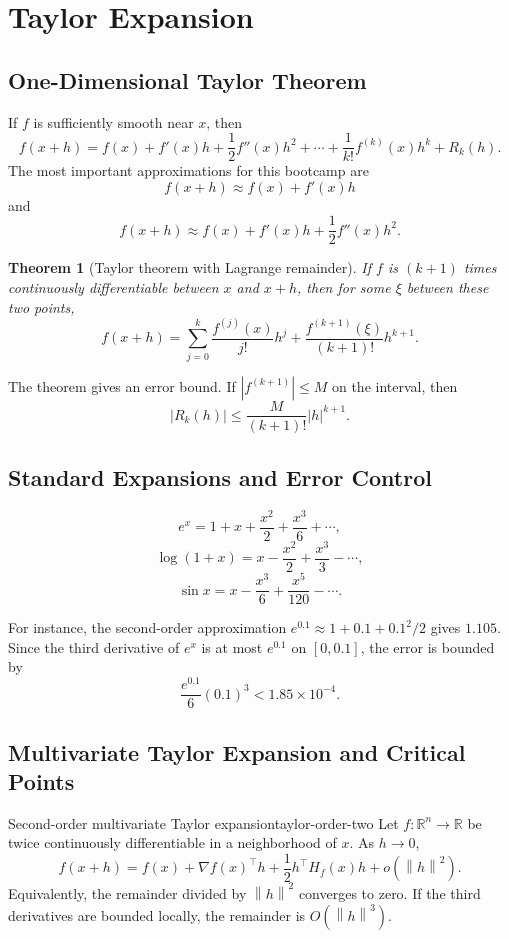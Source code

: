 \documentclass[11pt]{article}
\newcommand{\R}{\mathbb{R}}
\newcommand{\norm}[1]{\left\lVert #1\right\rVert}
\theoremstyle{definition}
\theoremstyle{plain}
\newtheorem{theorem}[definition]{Theorem}
\theoremstyle{remark}
\begin{document}
\section{Taylor Expansion}

\subsection{One-Dimensional Taylor Theorem}

If $f$ is sufficiently smooth near $x$, then
\[
f(x+h)=f(x)+f'(x)h+\frac{1}{2}f''(x)h^2+\cdots+
\frac{1}{k!}f^{(k)}(x)h^k+R_k(h).
\]
The most important approximations for this bootcamp are
\[
f(x+h)\approx f(x)+f'(x)h
\]
and
\[
f(x+h)\approx f(x)+f'(x)h+\frac{1}{2}f''(x)h^2.
\]

\begin{theorem}[Taylor theorem with Lagrange remainder]
If $f$ is $(k+1)$ times continuously differentiable between $x$ and $x+h$,
then for some $\xi$ between these two points,
\[
f(x+h)=\sum_{j=0}^k\frac{f^{(j)}(x)}{j!}h^j
+\frac{f^{(k+1)}(\xi)}{(k+1)!}h^{k+1}.
\]
\end{theorem}

The theorem gives an error bound. If $|f^{(k+1)}|\leq M$ on the interval, then
\[
|R_k(h)|\leq\frac{M}{(k+1)!}|h|^{k+1}.
\]

\subsection{Standard Expansions and Error Control}

\[
e^x=1+x+\frac{x^2}{2}+\frac{x^3}{6}+\cdots,
\]
\[
\log(1+x)=x-\frac{x^2}{2}+\frac{x^3}{3}-\cdots,
\]
\[
\sin x=x-\frac{x^3}{6}+\frac{x^5}{120}-\cdots.
\]

For instance, the second-order approximation $e^{0.1}\approx1+0.1+0.1^2/2$
gives $1.105$. Since the third derivative of $e^x$ is at most $e^{0.1}$ on
$[0,0.1]$, the error is bounded by
\[
\frac{e^{0.1}}{6}(0.1)^3<1.85\times10^{-4}.
\]

\subsection{Multivariate Taylor Expansion and Critical Points}

\begin{keyproposition}{Second-order multivariate Taylor expansion}{taylor-order-two}
Let $f:\R^n\to\R$ be twice continuously differentiable in a neighborhood
of $x$. As $h\to0$,
\[
\boxed{
f(x+h)=f(x)+\nabla f(x)^\top h
+\frac{1}{2}h^\top H_f(x)h+o(\norm h^2).}
\]
Equivalently, the remainder divided by $\norm h^2$ converges to zero. If the
third derivatives are bounded locally, the remainder is $O(\norm h^3)$.
\end{keyproposition}
\end{document}
